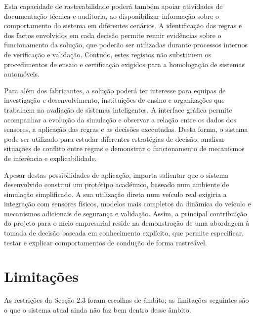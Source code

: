 Esta capacidade de rastreabilidade poderá também apoiar atividades de documentação técnica e auditoria, ao disponibilizar informação sobre o comportamento do sistema em diferentes cenários. A identificação das regras e dos factos envolvidos em cada decisão permite reunir evidências sobre o funcionamento da solução, que poderão ser utilizadas durante processos internos de verificação e validação. Contudo, estes registos não substituem os procedimentos de ensaio e certificação exigidos para a homologação de sistemas automóveis.

Para além dos fabricantes, a solução poderá ter interesse para equipas de investigação e
desenvolvimento, instituições de ensino e organizações que trabalhem na avaliação de sistemas
inteligentes. A interface gráfica permite acompanhar a evolução da simulação e observar a relação
entre os dados dos sensores, a aplicação das regras e as decisões executadas. Desta forma, o sistema
pode ser utilizado para estudar diferentes estratégias de decisão, analisar situações de conflito
entre regras e demonstrar o funcionamento de mecanismos de inferência e explicabilidade.

Apesar destas possibilidades de aplicação, importa salientar que o sistema desenvolvido constitui
um protótipo académico, baseado num ambiente de simulação simplificado. A sua utilização direta num
veículo real exigiria a integração com sensores físicos, modelos mais completos da dinâmica do
veículo e mecanismos adicionais de segurança e validação. Assim, a principal contribuição do projeto
para o meio empresarial reside na demonstração de uma abordagem à tomada de decisão baseada em
conhecimento explícito, que permite especificar, testar e explicar comportamentos de condução de
forma rastreável.

\section{Limitações}\label{sec:limitacoes}

As restrições da Secção 2.3 foram escolhas de âmbito; as limitações seguintes são o que o sistema atual ainda não faz bem dentro desse âmbito.

